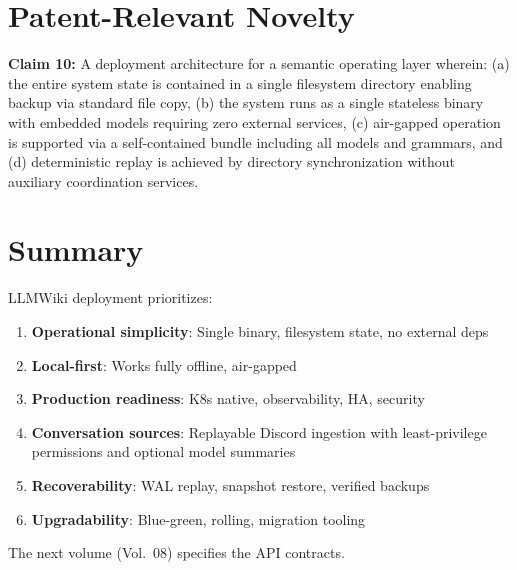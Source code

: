 \section{Patent-Relevant Novelty}
\label{sec:deploy:patent}

\begin{patentclaim}
\textbf{Claim 10:} A deployment architecture for a semantic operating layer wherein: (a) the entire system state is contained in a single filesystem directory enabling backup via standard file copy, (b) the system runs as a single stateless binary with embedded models requiring zero external services, (c) air-gapped operation is supported via a self-contained bundle including all models and grammars, and (d) deterministic replay is achieved by directory synchronization without auxiliary coordination services.
\end{patentclaim}

\section{Summary}
\label{sec:deploy:summary}

LLMWiki deployment prioritizes:
\begin{enumerate}
  \item \textbf{Operational simplicity}: Single binary, filesystem state, no external deps
  \item \textbf{Local-first}: Works fully offline, air-gapped
  \item \textbf{Production readiness}: K8s native, observability, HA, security
  \item \textbf{Conversation sources}: Replayable Discord ingestion with least-privilege permissions and optional model summaries
  \item \textbf{Recoverability}: WAL replay, snapshot restore, verified backups
  \item \textbf{Upgradability}: Blue-green, rolling, migration tooling
\end{enumerate}
The next volume (Vol.~08) specifies the API contracts.

